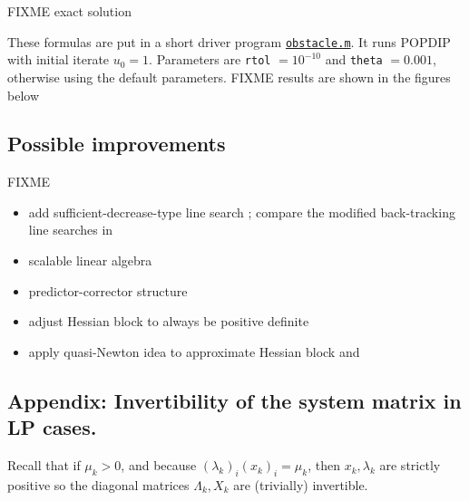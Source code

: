 \documentclass[11pt]{article}
\begin{document}
FIXME exact solution

These formulas are put in a short driver program \href{https://github.com/bueler/popdip/blob/main/matlab/obstacle.m}{\texttt{obstacle.m}}.  It runs POPDIP with initial iterate $u_0=1$.  Parameters are \texttt{rtol} $=10^{-10}$ and \texttt{theta} $=0.001$, otherwise using the default parameters.  FIXME results are shown in the figures below




\subsection*{Possible improvements}

FIXME
\begin{itemize}
\item add sufficient-decrease-type line search \cite[sections 19.3, 19.4]{NocedalWright2006}; compare the modified back-tracking line searches in \cite{BensonMunson2006}
\item scalable linear algebra
\item predictor-corrector structure \cite[section 14.2]{NocedalWright2006}
\item adjust Hessian block to always be positive definite \cite[section 11.4]{GrivaNashSofer2009}
\item apply quasi-Newton idea to approximate Hessian block \cite[sections 12.3, 13.5]{GrivaNashSofer2009} and \cite[section 19.3]{NocedalWright2006}
\end{itemize}


\medskip




\appendix
\subsection*{Appendix: Invertibility of the system matrix in LP cases.}

\newtheorem*{lemma}{Lemma}

Recall that if $\mu_k>0$, and because $(\lambda_k)_i (x_k)_i = \mu_k$, then $x_k,\lambda_k$ are strictly positive so the diagonal matrices $\Lambda_k,X_k$ are (trivially) invertible.
\end{document}
